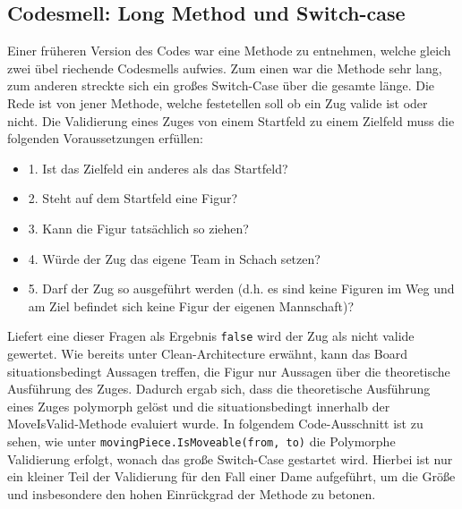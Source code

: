 \documentclass[
10pt, %
a4paper, %
oneside, %
headinclude,footinclude, %
BCOR5mm, %
]{scrartcl}
\begin{document}
\subsection{Codesmell: Long Method und Switch-case}
Einer früheren Version des Codes war eine Methode zu entnehmen, welche gleich zwei übel riechende Codesmells aufwies. Zum einen war die Methode sehr lang, zum anderen streckte sich ein großes Switch-Case über die gesamte länge. Die Rede ist von jener Methode, welche festetellen soll ob ein Zug valide ist oder nicht. Die Validierung eines Zuges von einem Startfeld zu einem Zielfeld muss die folgenden Voraussetzungen erfüllen:
\begin{center}
	\begin{itemize}
		\item 1. Ist das Zielfeld ein anderes als das Startfeld?
		\item 2. Steht auf dem Startfeld eine Figur?
		\item 3. Kann die Figur tatsächlich so ziehen?
		\item 4. Würde der Zug das eigene Team in Schach setzen?
		\item 5. Darf der Zug so ausgeführt werden (d.h. es sind keine Figuren im Weg und am Ziel befindet sich keine Figur der eigenen Mannschaft)?
	\end{itemize}
\end{center}
Liefert eine dieser Fragen als Ergebnis \texttt{false} wird der Zug als nicht valide gewertet. Wie bereits unter Clean-Architecture erwähnt, kann das Board situationsbedingt Aussagen treffen, die Figur nur Aussagen über die theoretische Ausführung des Zuges. Dadurch ergab sich, dass die theoretische Ausführung eines Zuges polymorph gelöst und die situationsbedingt innerhalb der MoveIsValid-Methode evaluiert wurde. In folgendem Code-Ausschnitt ist zu sehen, wie unter \texttt{movingPiece.IsMoveable(from, to)} die Polymorphe Validierung erfolgt, wonach das große Switch-Case gestartet wird. Hierbei ist nur ein kleiner Teil der Validierung für den Fall einer Dame aufgeführt, um die Größe  und insbesondere den hohen Einrückgrad der Methode zu betonen. 
\end{document}
